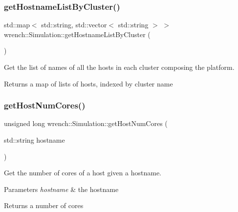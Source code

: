 \subsubsection{\texorpdfstring{get\+Hostname\+List\+By\+Cluster()}{getHostnameListByCluster()}}
{\footnotesize\ttfamily std\+::map$<$ std\+::string, std\+::vector$<$ std\+::string $>$ $>$ wrench\+::\+Simulation\+::get\+Hostname\+List\+By\+Cluster (\begin{DoxyParamCaption}{ }\end{DoxyParamCaption})}



Get the list of names of all the hosts in each cluster composing the platform. 

\begin{DoxyReturn}{Returns}
a map of lists of hosts, indexed by cluster name 
\end{DoxyReturn}
\mbox{\label{classwrench_1_1_simulation_a6f0f556690d10d683a61acc3f10f5521}} 
\subsubsection{\texorpdfstring{get\+Host\+Num\+Cores()}{getHostNumCores()}}
{\footnotesize\ttfamily unsigned long wrench\+::\+Simulation\+::get\+Host\+Num\+Cores (\begin{DoxyParamCaption}\item[{std\+::string}]{hostname }\end{DoxyParamCaption})\hspace{0.3cm}{\ttfamily [static]}}



Get the number of cores of a host given a hostname. 


\begin{DoxyParams}{Parameters}
{\em hostname} & the hostname \\
\hline
\end{DoxyParams}
\begin{DoxyReturn}{Returns}
a number of cores 
\end{DoxyReturn}
\mbox{\label{classwrench_1_1_simulation_abb75fd040236995186d9ad45434fe069}} 
